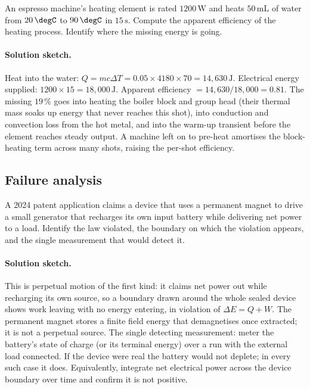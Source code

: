 \begin{exercise}
An espresso machine's heating element is rated $1200\,\text{W}$ and
heats $50\,\text{mL}$ of water from $20\,\degC$ to $90\,\degC$ in
$15\,\text{s}$. Compute the apparent efficiency of the heating
process. Identify where the missing energy is going.
\paragraph{Solution sketch.} Heat into the water:
$Q = mc\Delta T = 0.05 \times 4180 \times 70 = 14{,}630\,\text{J}$.
Electrical energy supplied: $1200 \times 15 = 18{,}000\,\text{J}$.
Apparent efficiency $= 14{,}630/18{,}000 = 0.81$. The missing $19\,\%$
goes into heating the boiler block and group head (their thermal mass
soaks up energy that never reaches this shot), into conduction and
convection loss from the hot metal, and into the warm-up transient
before the element reaches steady output. A machine left on to
pre-heat amortises the block-heating term across many shots, raising
the per-shot efficiency.
\end{exercise}

\subsection*{Failure analysis}

\begin{exercise}
A 2024 patent application claims a device that uses a permanent
magnet to drive a small generator that recharges its own input
battery while delivering net power to a load. Identify the law
violated, the boundary on which the violation appears, and the
single measurement that would detect it.
\paragraph{Solution sketch.} This is perpetual motion of the first
kind: it claims net power out while recharging its own source, so a
boundary drawn around the whole sealed device shows work leaving with
no energy entering, in violation of $\Delta E = Q + W$. The permanent
magnet stores a finite field energy that demagnetises once extracted;
it is not a perpetual source. The single detecting measurement: meter
the battery's state of charge (or its terminal energy) over a run with
the external load connected. If the device were real the battery would
not deplete; in every such case it does. Equivalently, integrate net
electrical power across the device boundary over time and confirm it is
not positive.
\end{exercise}

